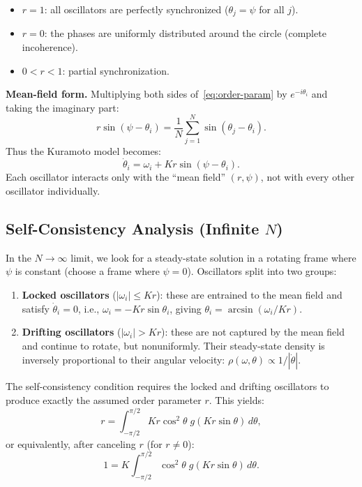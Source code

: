 \documentclass[11pt,letterpaper]{article}
\theoremstyle{definition}
\theoremstyle{plain}
\theoremstyle{remark}
\begin{document}
\begin{itemize}[leftmargin=2em]
\item $r = 1$: all oscillators are perfectly synchronized
      ($\theta_j = \psi$ for all $j$).
\item $r = 0$: the phases are uniformly distributed around the circle
      (complete incoherence).
\item $0 < r < 1$: partial synchronization.
\end{itemize}

\textbf{Mean-field form.}  Multiplying both sides of~\eqref{eq:order-param}
by $e^{-i\theta_i}$ and taking the imaginary part:
\[
  r\sin(\psi - \theta_i) = \frac{1}{N}\sum_{j=1}^{N}
  \sin(\theta_j - \theta_i).
\]
Thus the Kuramoto model becomes:
\begin{equation}\label{eq:kuramoto-mf}
  \dot{\theta}_i = \omega_i + Kr\sin(\psi - \theta_i).
\end{equation}
Each oscillator interacts only with the ``mean field'' $(r,\psi)$, not with
every other oscillator individually.

\subsection{Self-Consistency Analysis (Infinite $N$)}

In the $N\to\infty$ limit, we look for a steady-state solution in a
rotating frame where $\psi$ is constant (choose a frame where $\psi=0$).
Oscillators split into two groups:

\begin{enumerate}[leftmargin=2em]
\item \textbf{Locked oscillators} ($|\omega_i| \le Kr$): these are
      entrained to the mean field and satisfy $\dot{\theta}_i = 0$, i.e.,
      $\omega_i = -Kr\sin\theta_i$, giving
      $\theta_i = \arcsin(\omega_i / Kr)$.

\item \textbf{Drifting oscillators} ($|\omega_i| > Kr$): these are not
      captured by the mean field and continue to rotate, but nonuniformly.
      Their steady-state density is inversely proportional to their angular
      velocity: $\rho(\omega,\theta) \propto 1/|\dot{\theta}|$.
\end{enumerate}

The self-consistency condition requires the locked and drifting oscillators
to produce exactly the assumed order parameter $r$.  This yields:
\begin{equation}\label{eq:self-consistency}
  r = \int_{-\pi/2}^{\pi/2} Kr\cos^2\theta\; g(Kr\sin\theta)\,d\theta,
\end{equation}
or equivalently, after canceling $r$ (for $r\neq 0$):
\begin{equation}\label{eq:self-consistency-2}
  1 = K\int_{-\pi/2}^{\pi/2} \cos^2\theta\; g(Kr\sin\theta)\,d\theta.
\end{equation}
\end{document}
